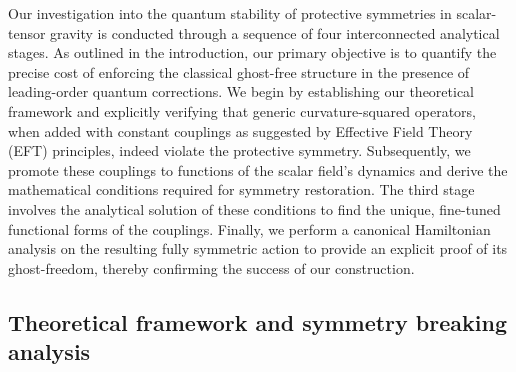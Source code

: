 \documentclass[twocolumn]{aastex631}
\begin{document}
Our investigation into the quantum stability of protective symmetries in scalar-tensor gravity is conducted through a sequence of four interconnected analytical stages. As outlined in the introduction, our primary objective is to quantify the precise cost of enforcing the classical ghost-free structure in the presence of leading-order quantum corrections. We begin by establishing our theoretical framework and explicitly verifying that generic curvature-squared operators, when added with constant couplings as suggested by Effective Field Theory (EFT) principles, indeed violate the protective symmetry. Subsequently, we promote these couplings to functions of the scalar field's dynamics and derive the mathematical conditions required for symmetry restoration. The third stage involves the analytical solution of these conditions to find the unique, fine-tuned functional forms of the couplings. Finally, we perform a canonical Hamiltonian analysis on the resulting fully symmetric action to provide an explicit proof of its ghost-freedom, thereby confirming the success of our construction.

\subsection{Theoretical framework and symmetry breaking analysis}
\end{document}
